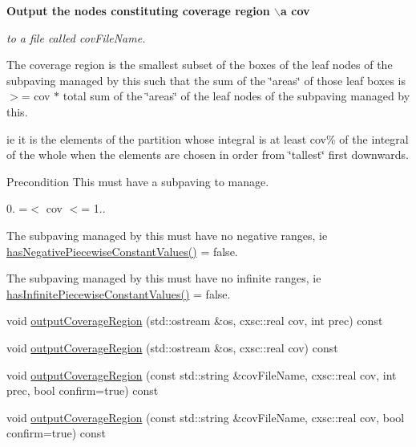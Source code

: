 \begin{Indent}{\bf \-Output the nodes constituting coverage region $\backslash$a cov}\par
{\em to a file called {\itshape cov\-File\-Name\/}.

\-The coverage region is the smallest subset of the boxes of the leaf nodes of the subpaving managed by this such that the sum of the \char`\"{}areas\char`\"{} of those leaf boxes is $>$= cov $\ast$ total sum of the \char`\"{}areas\char`\"{} of the leaf nodes of the subpaving managed by this.

ie it is the elements of the partition whose integral is at least cov\% of the integral of the whole when the elements are chosen in order from \char`\"{}tallest\char`\"{} first downwards.

\begin{DoxyPrecond}{\-Precondition}
\-This must have a subpaving to manage. 

0. =$<$ cov $<$= 1.. 

\-The subpaving managed by this must have no negative ranges, ie \hyperlink{classsubpavings_1_1PiecewiseConstantFunction_a892d2caaed6213ae262f2a0b1dba27b5}{has\-Negative\-Piecewise\-Constant\-Values()} = false. 

\-The subpaving managed by this must have no infinite ranges, ie \hyperlink{classsubpavings_1_1PiecewiseConstantFunction_a06b96fb88f394c3b65af65e6eff44e7a}{has\-Infinite\-Piecewise\-Constant\-Values()} = false. 
\end{DoxyPrecond}
}\begin{DoxyCompactItemize}
\item 
void \hyperlink{classsubpavings_1_1PiecewiseConstantFunction_a86b60ec6a406396eafd09123c20deedf}{output\-Coverage\-Region} (std\-::ostream \&os, cxsc\-::real cov, int prec) const 
\item 
void \hyperlink{classsubpavings_1_1PiecewiseConstantFunction_a213cebe89d7510df1b0e0c3790c9e33a}{output\-Coverage\-Region} (std\-::ostream \&os, cxsc\-::real cov) const 
\item 
void \hyperlink{classsubpavings_1_1PiecewiseConstantFunction_a4208d0549a7254c38af194e1953c6cc7}{output\-Coverage\-Region} (const std\-::string \&cov\-File\-Name, cxsc\-::real cov, int prec, bool confirm=true) const 
\item 
void \hyperlink{classsubpavings_1_1PiecewiseConstantFunction_a38e6bded7df5f65184c4fc5a9b3997f8}{output\-Coverage\-Region} (const std\-::string \&cov\-File\-Name, cxsc\-::real cov, bool confirm=true) const 
\end{DoxyCompactItemize}
\end{Indent}
